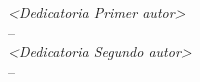 %
\thesisPresentationDate

\vspace*{\fill}

\begin{flushright} 
    \textit{<Dedicatoria Primer autor>} \\
    -- \thesisFirstAuthor \\
    \vspace*{\fill}
    \textit{<Dedicatoria Segundo autor>} \\
    -- \thesisFirstAuthor \\
    \vspace*{\fill}
\end{flushright}
